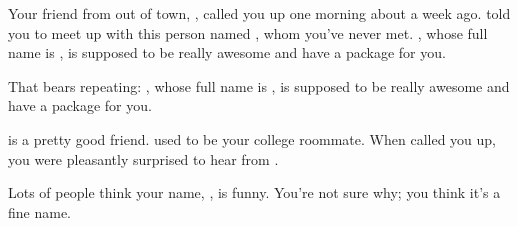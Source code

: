 \documentclass[char]{guildcamp3}
\begin{document}
\name{\cSciOne{}}


\updatemacro{\cNPC}{
  \unknownplayer %
  }





Your friend from out of town, \cSomeGuy{\intro}, called you up one
morning about a week ago.  \cSomeGuy{} told you to meet up with this
person named \cNPC{}, whom you've never met.  \cNPC{}, whose full name
is \cNPC{\intro}, is supposed to be really awesome and have a package
for you.

That bears repeating: \cNPC{\nick{\informal}}, whose full name is
\cNPC{\full}, is supposed to be really awesome and have a package for
you.

\cSomeGuy{} is a pretty good friend.  \cSomeGuy{\They} used to be your
college roommate.  When \cSomeGuy{\they} called you up, you were
pleasantly surprised to hear from \cSomeGuy{\them}.

Lots of people think your name, \me{\intro}, is funny.  You're not
sure why; you think it's a fine name.
\end{document}
